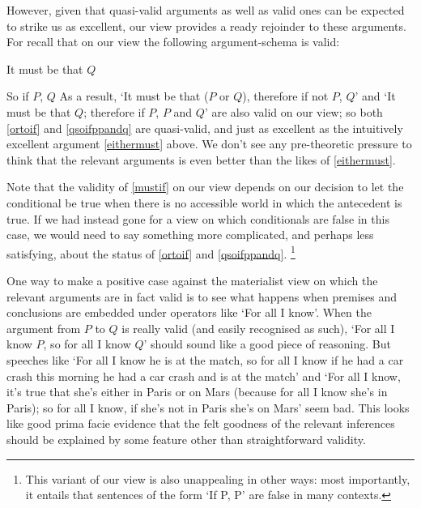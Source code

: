 \documentclass[If.tex]{subfiles}
\begin{document}
However, given that quasi-valid arguments as well as valid ones can be expected to strike us as excellent, our view provides a ready rejoinder to these arguments. For recall that on our view the following argument-schema is valid:
\begin{prop}
	\sitem[Must-if] \label{mustif}
	It must be that $Q$
	
	So if $P$, $Q$
As a result, ‘It must be that ($P$ or $Q$), therefore if not $P$, $Q$’ and ‘It must be that $Q$; therefore if $P$, $P$ and $Q$’ are also valid on our view; so both \ref{ortoif} and \ref{qsoifppandq} are quasi-valid, and just as excellent as the intuitively excellent argument \ref{eithermust} above. We don't see any pre-theoretic pressure to think that the relevant arguments is even better than the likes of \ref{eithermust}.

Note that the validity of \ref{mustif} on our view depends on our decision to let the conditional be true when there is no accessible world in which the antecedent is true. If we had instead gone for a view on which conditionals are false in this case, we would need to say something more complicated, and perhaps less satisfying, about the status of \ref{ortoif} and \ref{qsoifppandq}.%
\footnote{This variant of our view is also unappealing in other ways: most importantly, it entails that sentences of the form ‘If P, P’ are false in many contexts.}

One way to make a positive case against the materialist view on which the relevant arguments are in fact valid is to see what happens when premises and conclusions are embedded under operators like ‘For all I know’. When the argument from $P$ to $Q$ is really valid (and easily recognised as such), ‘For all I know $P$, so for all I know $Q$’ should sound like a good piece of reasoning. But speeches like ‘For all I know he is at the match, so for all I know if he had a car crash this morning he had a car crash and is at the match’ and ‘For all I know, it's true that she's either in Paris or on Mars (because for all I know she's in Paris); so for all I know, if she's not in Paris she's on Mars’ seem bad. This looks like good prima facie evidence that the felt goodness of the relevant inferences should be explained by some feature other than straightforward validity.


\end{prop}
\end{document}
